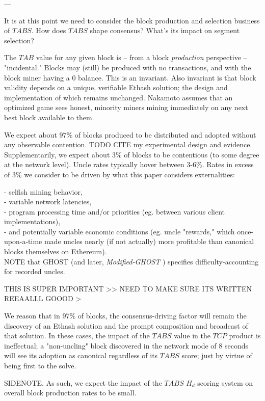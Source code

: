 \documentclass[11pt]{article}
\theoremstyle{plain}
\newcommand{\mghost}{\textit{Modified-GHOST }}
\begin{document}
{---

It is at this point we need to consider the block production and selection
business of $TABS$.
How does $TABS$ shape consensus? What's its impact on segment selection?

The $TAB$ value for any given block is -- from a block \textit{production}
perspective -- "incidental."
Blocks may (still) be produced with no transactions, and with the block miner
having a 0 balance. This is an invariant.
Also invariant is that block validity depends on a unique, verifiable Ethash
solution; the design and implementation of which remains unchanged.
Nakamoto assumes that an optimized game sees honest, minority miners mining
immediately on any next best block available to them.

We expect about 97\% of blocks produced to be distributed and adopted without
any observable contention. TODO CITE my experimental design and evidence.
Supplementarily, we expect about 3\% of blocks to be contentious (to some
degree at the network level).
Uncle rates typically hover between 3-6\%. Rates in excess of 3\% we consider
to be driven by what this paper considers externalities:

- selfish mining behavior, \\
- variable network latencies, \\
- program processing time and/or priorities (eg. between various client
implementations), \\
- and potentially variable economic conditions (eg. uncle "rewards," which
once-upon-a-time made uncles nearly (if not actually) more profitable than
canonical blocks themselves on Ethereum). \\

NOTE that GHOST (and later, \mghost) specifies difficulty-accounting
for recorded uncles.

THIS IS SUPER IMPORTANT >> NEED TO MAKE SURE ITS WRITTEN REEAALLL GOOOD >

We reason that in 97\% of blocks, the consensus-driving factor will remain the
discovery of an Ethash solution and the prompt composition and broadcast of
that solution.
In these cases, the impact of the $TABS$ value in the $TCP$ product is
ineffectual; a "non-uncling" block discovered in the network mode of 8 seconds
will see
its adoption as canonical regardless of its $TABS$ score; just by virtue of
being first to the solve.

SIDENOTE. As such, we expect the impact of the $TABS$ \times $H_{d}$ scoring
system on overall block production rates to be small.

}
\end{document}
